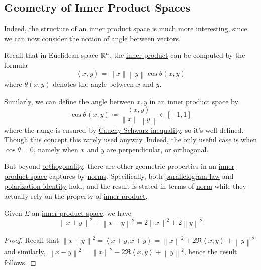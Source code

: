 \subsection{Geometry of Inner Product Spaces}
Indeed, the structure of an \hyperref[def:inner-product-space]{inner product space} is much more interesting, since we can now consider the notion of angle between vectors.
\begin{prev}
	Recall that in Euclidean space \(\mathbb{\MakeUppercase{r}} ^n\), the \hyperref[def:inner-product]{inner product} can be computed by the formula
	\[
		\left\langle x, y \right\rangle = \left\lVert x\right\rVert \left\lVert y\right\rVert \cos \theta (x, y)
	\]
	where \(\theta (x, y)\) denotes the angle between \(x\) and \(y\).
\end{prev}

Similarly, we can define the angle between \(x, y\) in an \hyperref[def:inner-product-space]{inner product space} by
\[
	\cos \theta (x, y) \coloneqq \frac{\left\langle x, y \right\rangle }{\left\lVert x\right\rVert \left\lVert y\right\rVert } \in [-1, 1]
\]
where the range is ensured by \hyperref[thm:Cauchy-Schwarz-ineq]{Cauchy-Schwarz inequality}, so it's well-defined. Though this concept this rarely used anyway. Indeed, the only useful case is when \(\cos \theta = 0\), namely when \(x\) and \(y\) are perpendicular, or \hyperref[def:orthogonal]{orthogonal}.

But beyond \hyperref[def:orthogonal]{orthogonality}, there are other geometric properties in an \hyperref[def:inner-product-space]{inner product space} captures by \hyperref[def:norm]{norms}. Specifically, both \hyperref[lma:parallelogram-law]{parallelogram law} and \hyperref[lma:polatization-identity]{polarization identity} hold, and the result is stated in terms of \hyperref[def:norm]{norm} while they actually rely on the property of \hyperref[def:inner-product]{inner product}.

\begin{lemma}\label{lma:parallelogram-law}
	Given \(E\) an \hyperref[def:inner-product-space]{inner product space}, we have
	\[
		\left\lVert x+y\right\rVert ^{2} + \left\lVert x-y\right\rVert ^{2} = 2\left\lVert x\right\rVert ^{2} + 2\left\lVert y\right\rVert ^{2}
	\]
\end{lemma}
\begin{proof}
	Recall that \(\left\lVert x + y\right\rVert ^{2} = \left\langle x + y, x + y \right\rangle = \left\lVert x\right\rVert ^{2} + 2 \Re \left\langle x, y \right\rangle + \left\lVert y\right\rVert ^{2} \) and similarly, \(\left\lVert x - y\right\rVert ^{2} = \left\lVert x\right\rVert ^{2} - 2\Re \left\langle x, y \right\rangle + \left\lVert y\right\rVert ^{2}\), hence the result follows.
\end{proof}

